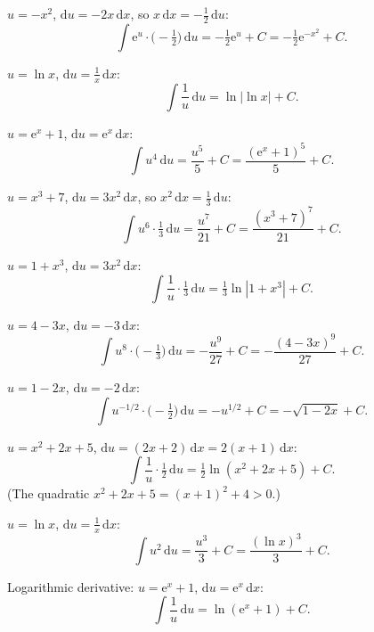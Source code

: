 \begin{solutions}
  \item $u=-x^{2}$, $\mathrm{d}u=-2x\,\mathrm{d}x$, so
        $x\,\mathrm{d}x=-\tfrac12\,\mathrm{d}u$:
        \[
          \int \mathrm{e}^{u}\cdot\bigl(-\tfrac12\bigr)\,\mathrm{d}u
            =-\tfrac12\mathrm{e}^{u}+C=-\tfrac12\mathrm{e}^{-x^{2}}+C .
        \]

  \item $u=\ln x$, $\mathrm{d}u=\tfrac1x\,\mathrm{d}x$:
        \[
          \int \frac1u\,\mathrm{d}u=\ln|\ln x|+C .
        \]

  \item $u=\mathrm{e}^{x}+1$, $\mathrm{d}u=\mathrm{e}^{x}\,\mathrm{d}x$:
        \[
          \int u^{4}\,\mathrm{d}u
            =\frac{u^{5}}{5}+C=\frac{(\mathrm{e}^{x}+1)^{5}}{5}+C .
        \]

  \item $u=x^{3}+7$, $\mathrm{d}u=3x^{2}\,\mathrm{d}x$, so
        $x^{2}\,\mathrm{d}x=\tfrac13\,\mathrm{d}u$:
        \[
          \int u^{6}\cdot\tfrac13\,\mathrm{d}u
            =\frac{u^{7}}{21}+C=\frac{(x^{3}+7)^{7}}{21}+C .
        \]

  \item $u=1+x^{3}$, $\mathrm{d}u=3x^{2}\,\mathrm{d}x$:
        \[
          \int \frac1u\cdot\tfrac13\,\mathrm{d}u
            =\tfrac13\ln|1+x^{3}|+C .
        \]

  \item $u=4-3x$, $\mathrm{d}u=-3\,\mathrm{d}x$:
        \[
          \int u^{8}\cdot\bigl(-\tfrac13\bigr)\,\mathrm{d}u
            =-\frac{u^{9}}{27}+C=-\frac{(4-3x)^{9}}{27}+C .
        \]

  \item $u=1-2x$, $\mathrm{d}u=-2\,\mathrm{d}x$:
        \[
          \int u^{-1/2}\cdot\bigl(-\tfrac12\bigr)\,\mathrm{d}u
            =-u^{1/2}+C=-\sqrt{1-2x}+C .
        \]

  \item $u=x^{2}+2x+5$, $\mathrm{d}u=(2x+2)\,\mathrm{d}x=2(x+1)\,\mathrm{d}x$:
        \[
          \int \frac1u\cdot\tfrac12\,\mathrm{d}u
            =\tfrac12\ln(x^{2}+2x+5)+C .
        \]
        (The quadratic $x^{2}+2x+5=(x+1)^{2}+4>0$.)

  \item $u=\ln x$, $\mathrm{d}u=\tfrac1x\,\mathrm{d}x$:
        \[
          \int u^{2}\,\mathrm{d}u=\frac{u^{3}}{3}+C=\frac{(\ln x)^{3}}{3}+C .
        \]

  \item Logarithmic derivative: $u=\mathrm{e}^{x}+1$,
        $\mathrm{d}u=\mathrm{e}^{x}\,\mathrm{d}x$:
        \[
          \int \frac1u\,\mathrm{d}u=\ln(\mathrm{e}^{x}+1)+C .
        \]


\end{solutions}
